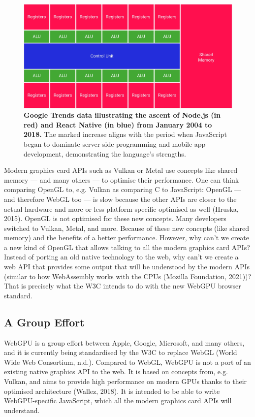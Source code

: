 \documentclass[10pt]{article}
\begin{document}
\begin{sloppypar}
  \begin{figure}[ht]
    \centering
    \includegraphics[width=\textwidth]{figures/shared-memory.png}
    \caption[Google Trends data illustrating the ascent of Node.js and React Native.]{\textbf{Google Trends data illustrating the ascent of Node.js (in red) and React Native (in blue) from January 2004 to 2018.} The marked increase aligns with the period when JavaScript began to dominate server-side programming and mobile app development, demonstrating the language’s strengths.}
    \label{fig:shared-memory}
  \end{figure}

  Modern graphics card APIs such as Vulkan or Metal use concepts like shared memory — and many others — to optimise their performance. One can think comparing OpenGL to, e.g. Vulkan as comparing C to JavaScript: OpenGL — and therefore WebGL too — is slow because the other APIs are closer to the actual hardware and more or less platform-specific optimised as well (Hruska, 2015). OpenGL is not optimised for these new concepts. Many developers switched to Vulkan, Metal, and more. Because of these new concepts (like shared memory) and the benefits of a better performance. However, why can’t we create a new kind of OpenGL that allows talking to all the modern graphics card APIs? Instead of porting an old native technology to the web, why can’t we create a web API that provides some output that will be understood by the modern APIs (similar to how WebAssembly works with the CPUs (Mozilla Foundation, 2021))? That is precisely what the W3C intends to do with the new WebGPU browser standard.

  \subsection{A Group Effort}
  \label{subsec:a-group-effort}

  WebGPU is a group effort between Apple, Google, Microsoft, and many others, and it is currently being standardised by the W3C to replace WebGL (World Wide Web Consortium, n.d.). Compared to WebGL, WebGPU is not a port of an existing native graphics API to the web. It is based on concepts from, e.g. Vulkan, and aims to provide high performance on modern GPUs thanks to their optimised architecture (Wallez, 2018). It is intended to be able to write WebGPU-specific JavaScript, which all the modern graphics card APIs will understand.


\end{sloppypar}
\end{document}
